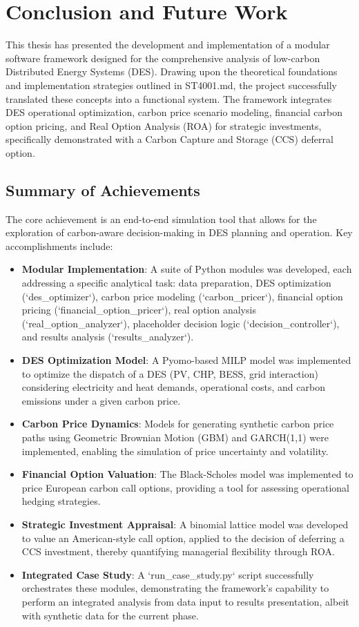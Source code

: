 \chapter{Conclusion and Future Work}
\label{chap:conclusion}

This thesis has presented the development and implementation of a modular software framework designed for the comprehensive analysis of low-carbon Distributed Energy Systems (DES). Drawing upon the theoretical foundations and implementation strategies outlined in ST4001.md, the project successfully translated these concepts into a functional system. The framework integrates DES operational optimization, carbon price scenario modeling, financial carbon option pricing, and Real Option Analysis (ROA) for strategic investments, specifically demonstrated with a Carbon Capture and Storage (CCS) deferral option.

\section{Summary of Achievements}
The core achievement is an end-to-end simulation tool that allows for the exploration of carbon-aware decision-making in DES planning and operation. Key accomplishments include:
\begin{itemize}
    \item \textbf{Modular Implementation}: A suite of Python modules was developed, each addressing a specific analytical task: data preparation, DES optimization (`des_optimizer`), carbon price modeling (`carbon_pricer`), financial option pricing (`financial_option_pricer`), real option analysis (`real_option_analyzer`), placeholder decision logic (`decision_controller`), and results analysis (`results_analyzer`).
    \item \textbf{DES Optimization Model}: A Pyomo-based MILP model was implemented to optimize the dispatch of a DES (PV, CHP, BESS, grid interaction) considering electricity and heat demands, operational costs, and carbon emissions under a given carbon price.
    \item \textbf{Carbon Price Dynamics}: Models for generating synthetic carbon price paths using Geometric Brownian Motion (GBM) and GARCH(1,1) were implemented, enabling the simulation of price uncertainty and volatility.
    \item \textbf{Financial Option Valuation}: The Black-Scholes model was implemented to price European carbon call options, providing a tool for assessing operational hedging strategies.
    \item \textbf{Strategic Investment Appraisal}: A binomial lattice model was developed to value an American-style call option, applied to the decision of deferring a CCS investment, thereby quantifying managerial flexibility through ROA.
    \item \textbf{Integrated Case Study}: A `run_case_study.py` script successfully orchestrates these modules, demonstrating the framework's capability to perform an integrated analysis from data input to results presentation, albeit with synthetic data for the current phase.
\end{itemize}

